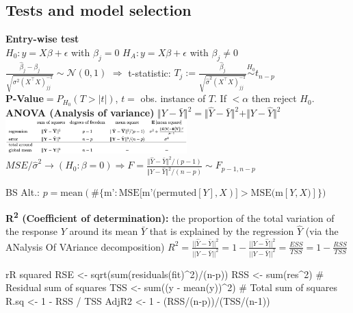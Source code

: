 \subsection*{Tests and model selection}
\textbf{Entry-wise test}\\
$H_0: y = X\beta + \epsilon$ with $\beta_j=0$
$H_A: y = X\beta + \epsilon$ with $\beta_j\neq 0$\\
$\frac{\hat \beta_j - \beta_j}{\sqrt{\sigma^2(X^\top X)^{-1}_{jj}}} \sim \mathcal{N}(0,1)$ $\Rightarrow$
t-statistic: $T_j:=\frac{\hat \beta_j}{\sqrt{\hat \sigma^2 (X^\top X)^{-1}_{jj}}} \stackrel{H_0}{\sim} t_{n-p}$\\
\textbf{P-Value}$=P_{H_0}(T>|t|)$, $t=$ obs. instance of $T$.
If $< \alpha$ then reject $H_0$.
\textbf{ANOVA (Analysis of variance)} $\Vert Y-\bar Y \Vert^2=\Vert  \hat Y - \bar Y\Vert^2+\Vert Y-\hat Y\Vert^2$\\
\includegraphics[width = 7cm]{ANOVA.png}
$MSE/\hat{\sigma}^2\rightarrow(H_0:\beta = 0) \Rightarrow F=\frac{\Vert  \hat Y - \bar Y\Vert^2/(p-1)}{\Vert Y- \hat Y\Vert^2/(n-p)}\sim F_{p-1,n-p}$


BS Alt.: $p=(\#\{:\text{MSE[m'(permuted}[Y],X)] >[Y,X)]\})$

\textbf{R\textsuperscript{2} (Coefficient of determination):} the proportion of the total variation of the response $Y$ around its mean $\bar{Y}$ that is explained by the regression $$ (via the ANalysis Of VAriance decomposition)
$R^2==1- =  = 1-$

\begin{codebox}{r}{R squared}
RSE <- sqrt(sum(residuals(fit)^2)/(n-p))
RSS <- sum(res^2) # Residual sum of squares
TSS <- sum((y - mean(y))^2) # Total sum of squares
R.sq <- 1 - RSS / TSS
AdjR2 <- 1 - (RSS/(n-p))/(TSS/(n-1))
\end{codebox}

